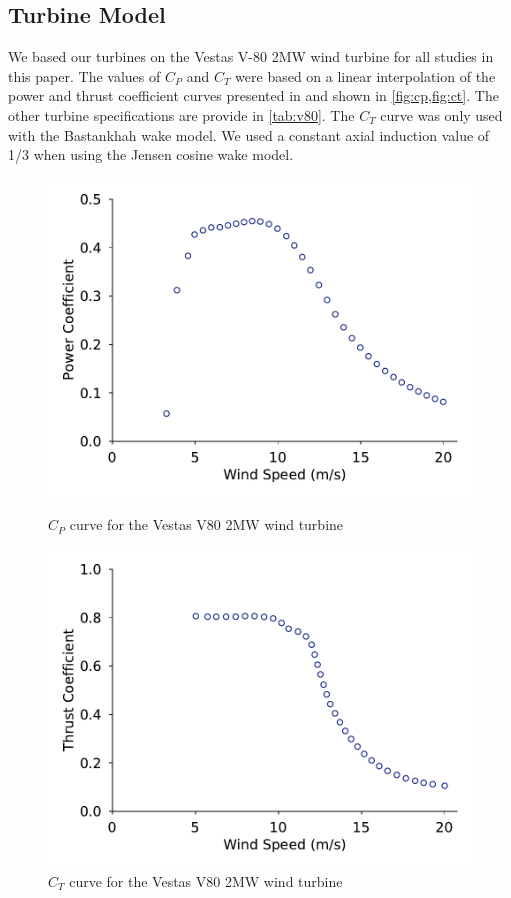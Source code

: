 \documentclass{jpconf}
\begin{document}
\subsection{Turbine Model}
We based our turbines on the Vestas V-80 2MW wind turbine for all studies in this paper. The values of $C_P$ and $C_T$ were based on a linear interpolation of the power and thrust coefficient curves presented in \cite{niayifar2016} and shown in \cref{fig:cp,fig:ct}. The other turbine specifications are provide in \cref{tab:v80}. The $C_T$ curve was only used with the Bastankhah wake model. We used a constant axial induction value of 1/3 when using the Jensen cosine wake model.
%
\begin{figure}[h!]
	\centering
	\begin{minipage}[t]{0.48\textwidth}
		\centering
		\includegraphics[width=\textwidth, trim={0cm 0cm 0cm 0cm}, clip]{inputs/cp_curve_v80}
		\caption{$C_P$ curve for the Vestas V80 2MW wind turbine \cite{niayifar2016} }
		\label{fig:cp}
	\end{minipage}\hspace{1pc}%
	\begin{minipage}[t]{0.48\textwidth}
		\centering
		\includegraphics[width=\textwidth]{inputs/ct_curve_v80.pdf}
		\caption{$C_T$ curve for the Vestas V80 2MW wind turbine \cite{niayifar2016}}
		\label{fig:ct}
	\end{minipage} 
\end{figure}
\end{document}
